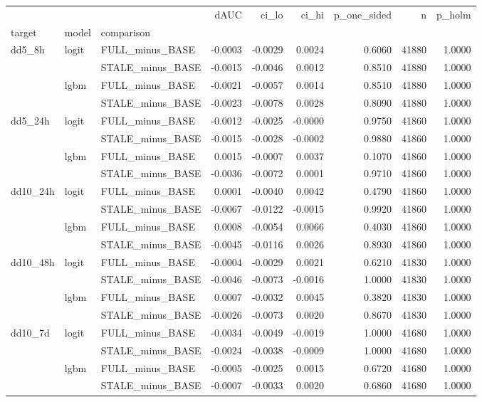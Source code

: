 \begin{tabular}{lllrrrrrr}
\toprule
 &  &  & dAUC & ci_lo & ci_hi & p_one_sided & n & p_holm \\
target & model & comparison &  &  &  &  &  &  \\
\midrule
\multirow[t]{4}{*}{dd5_8h} & \multirow[t]{2}{*}{logit} & FULL_minus_BASE & -0.0003 & -0.0029 & 0.0024 & 0.6060 & 41880 & 1.0000 \\
 &  & STALE_minus_BASE & -0.0015 & -0.0046 & 0.0012 & 0.8510 & 41880 & 1.0000 \\
\cline{2-9}
 & \multirow[t]{2}{*}{lgbm} & FULL_minus_BASE & -0.0021 & -0.0057 & 0.0014 & 0.8510 & 41880 & 1.0000 \\
 &  & STALE_minus_BASE & -0.0023 & -0.0078 & 0.0028 & 0.8090 & 41880 & 1.0000 \\
\cline{1-9} \cline{2-9}
\multirow[t]{4}{*}{dd5_24h} & \multirow[t]{2}{*}{logit} & FULL_minus_BASE & -0.0012 & -0.0025 & -0.0000 & 0.9750 & 41860 & 1.0000 \\
 &  & STALE_minus_BASE & -0.0015 & -0.0028 & -0.0002 & 0.9880 & 41860 & 1.0000 \\
\cline{2-9}
 & \multirow[t]{2}{*}{lgbm} & FULL_minus_BASE & 0.0015 & -0.0007 & 0.0037 & 0.1070 & 41860 & 1.0000 \\
 &  & STALE_minus_BASE & -0.0036 & -0.0072 & 0.0001 & 0.9710 & 41860 & 1.0000 \\
\cline{1-9} \cline{2-9}
\multirow[t]{4}{*}{dd10_24h} & \multirow[t]{2}{*}{logit} & FULL_minus_BASE & 0.0001 & -0.0040 & 0.0042 & 0.4790 & 41860 & 1.0000 \\
 &  & STALE_minus_BASE & -0.0067 & -0.0122 & -0.0015 & 0.9920 & 41860 & 1.0000 \\
\cline{2-9}
 & \multirow[t]{2}{*}{lgbm} & FULL_minus_BASE & 0.0008 & -0.0054 & 0.0066 & 0.4030 & 41860 & 1.0000 \\
 &  & STALE_minus_BASE & -0.0045 & -0.0116 & 0.0026 & 0.8930 & 41860 & 1.0000 \\
\cline{1-9} \cline{2-9}
\multirow[t]{4}{*}{dd10_48h} & \multirow[t]{2}{*}{logit} & FULL_minus_BASE & -0.0004 & -0.0029 & 0.0021 & 0.6210 & 41830 & 1.0000 \\
 &  & STALE_minus_BASE & -0.0046 & -0.0073 & -0.0016 & 1.0000 & 41830 & 1.0000 \\
\cline{2-9}
 & \multirow[t]{2}{*}{lgbm} & FULL_minus_BASE & 0.0007 & -0.0032 & 0.0045 & 0.3820 & 41830 & 1.0000 \\
 &  & STALE_minus_BASE & -0.0026 & -0.0073 & 0.0020 & 0.8670 & 41830 & 1.0000 \\
\cline{1-9} \cline{2-9}
\multirow[t]{4}{*}{dd10_7d} & \multirow[t]{2}{*}{logit} & FULL_minus_BASE & -0.0034 & -0.0049 & -0.0019 & 1.0000 & 41680 & 1.0000 \\
 &  & STALE_minus_BASE & -0.0024 & -0.0038 & -0.0009 & 1.0000 & 41680 & 1.0000 \\
\cline{2-9}
 & \multirow[t]{2}{*}{lgbm} & FULL_minus_BASE & -0.0005 & -0.0025 & 0.0015 & 0.6720 & 41680 & 1.0000 \\
 &  & STALE_minus_BASE & -0.0007 & -0.0033 & 0.0020 & 0.6860 & 41680 & 1.0000 \\
\cline{1-9} \cline{2-9}
\bottomrule
\end{tabular}

